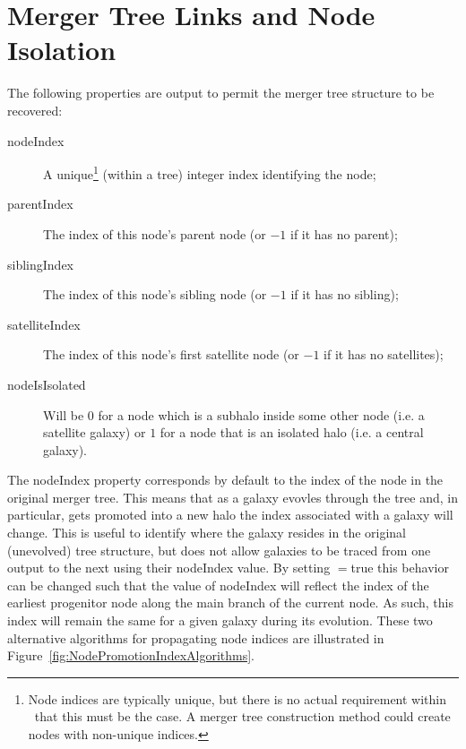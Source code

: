 \section{Merger Tree Links and Node Isolation}

The following properties are output to permit the merger tree structure to be recovered:
\begin{description}
 \item [{\normalfont \ttfamily nodeIndex}] A unique\footnote{Node indices are typically unique, but there is no actual requirement within \protect\glc\ that this must be the case. A merger tree construction method could create nodes with non-unique indices.} (within a tree) integer index identifying the node;
 \item [{\normalfont \ttfamily parentIndex}] The index of this node's parent node (or $-1$ if it has no parent);
 \item [{\normalfont \ttfamily siblingIndex}] The index of this node's sibling node (or $-1$ if it has no sibling);
 \item [{\normalfont \ttfamily satelliteIndex}] The index of this node's first satellite node (or $-1$ if it has no satellites);
 \item [{\normalfont \ttfamily nodeIsIsolated}] Will be $0$ for a node which is a subhalo inside some other node (i.e. a satellite galaxy) or $1$ for a node that is an isolated halo (i.e. a central galaxy).
\end{description}

The {\normalfont \ttfamily nodeIndex} property corresponds by default to the index of the node in the original merger tree. This means that as a galaxy evovles through the tree and, in particular, gets promoted into a new halo the index associated with a galaxy will change. This is useful to identify where the galaxy resides in the original (unevolved) tree structure, but does not allow galaxies to be traced from one output to the next using their {\normalfont \ttfamily nodeIndex} value. By setting {\normalfont \ttfamily [nodePromotionIndexShift]}$=${\normalfont \ttfamily true} this behavior can be changed such that the value of {\normalfont \ttfamily nodeIndex} will reflect the index of the earliest progenitor node along the main branch of the current node. As such, this index will remain the same for a given galaxy during its evolution. These two alternative algorithms for propagating node indices are illustrated in Figure~\ref{fig:NodePromotionIndexAlgorithms}.

